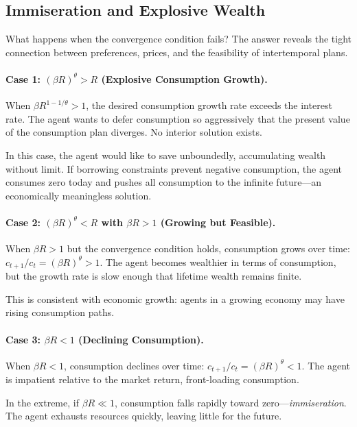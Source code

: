 \subsection{Immiseration and Explosive Wealth}
\label{subsec:immiseration}

What happens when the convergence condition fails? The answer reveals the tight connection between preferences, prices, and the feasibility of intertemporal plans.

\paragraph{Case 1: $(\beta R)^\theta > R$ (Explosive Consumption Growth).}
When $\beta R^{1 - 1/\theta} > 1$, the desired consumption growth rate exceeds the interest rate. The agent wants to defer consumption so aggressively that the present value of the consumption plan diverges. No interior solution exists.

In this case, the agent would like to save unboundedly, accumulating wealth without limit. If borrowing constraints prevent negative consumption, the agent consumes zero today and pushes all consumption to the infinite future---an economically meaningless solution.

\paragraph{Case 2: $(\beta R)^\theta < R$ with $\beta R > 1$ (Growing but Feasible).}
When $\beta R > 1$ but the convergence condition holds, consumption grows over time: $c_{t+1}/c_t = (\beta R)^\theta > 1$. The agent becomes wealthier in terms of consumption, but the growth rate is slow enough that lifetime wealth remains finite.

This is consistent with economic growth: agents in a growing economy may have rising consumption paths.

\paragraph{Case 3: $\beta R < 1$ (Declining Consumption).}
When $\beta R < 1$, consumption declines over time: $c_{t+1}/c_t = (\beta R)^\theta < 1$. The agent is impatient relative to the market return, front-loading consumption.

In the extreme, if $\beta R \ll 1$, consumption falls rapidly toward zero---\emph{immiseration}. The agent exhausts resources quickly, leaving little for the future.

